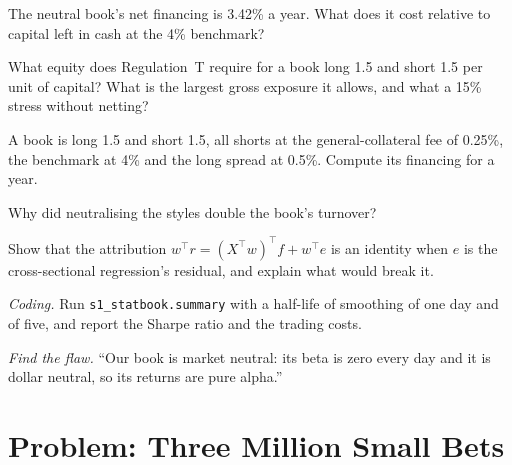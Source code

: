 \begin{exercise}[$\star$]\label{exo:s1:anatomy-of-a-stat-arb-book:2}
The neutral book's net financing is 3.42\% a year. What does it cost relative to capital left in cash at the 4\% benchmark?
\end{exercise}

\begin{exercise}[$\star$]\label{exo:s1:anatomy-of-a-stat-arb-book:3}
What equity does Regulation~T require for a book long 1.5 and short 1.5 per unit of capital? What is the largest gross exposure it allows, and what a 15\% stress
without netting?
\end{exercise}

\begin{exercise}[$\star\star$]\label{exo:s1:anatomy-of-a-stat-arb-book:4}
A book is long 1.5 and short 1.5, all shorts at the general-collateral fee of 0.25\%, the benchmark at 4\% and the long spread at 0.5\%. Compute its financing for a
year.
\end{exercise}

\begin{exercise}[$\star\star$]\label{exo:s1:anatomy-of-a-stat-arb-book:5}
Why did neutralising the styles double the book's turnover?
\end{exercise}

\begin{exercise}[$\star\star$]\label{exo:s1:anatomy-of-a-stat-arb-book:6}
Show that the attribution $w^\top r = (X^\top w)^\top f + w^\top e$ is an identity when $e$ is the cross-sectional regression's residual, and explain what would break
it.
\end{exercise}

\begin{exercise}[$\star\star\star$]\label{exo:s1:anatomy-of-a-stat-arb-book:7}
\emph{Coding.} Run \texttt{s1\_statbook.summary} with a half-life of smoothing of one day and of five, and report the Sharpe ratio and the trading costs.
\end{exercise}

\begin{exercise}[$\star\star\star$]\label{exo:s1:anatomy-of-a-stat-arb-book:8}
\emph{Find the flaw.} ``Our book is market neutral: its beta is zero every day and it is dollar neutral, so its returns are pure alpha.''
\end{exercise}

\section{Problem: Three Million Small Bets}

